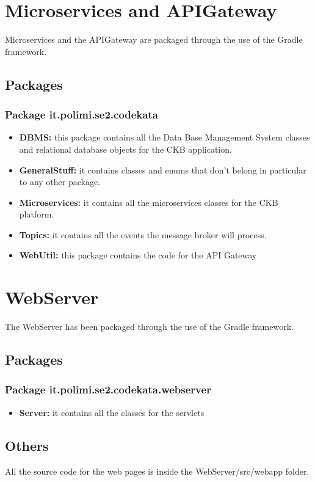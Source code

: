 \section{Microservices and APIGateway}
Microservices and the APIGateway are packaged through the use of the Gradle framework. 
\subsection{Packages}
\subsubsection{Package it.polimi.se2.codekata}
\begin{itemize}
    \item \textbf{DBMS:} this package contains all the Data Base Management System classes and relational database objects for the \ac{CKB} application.
    \item \textbf{GeneralStuff:} it contains classes and enums that don't belong in particular to any other package.
    \item \textbf{Microservices:} it contains all the microservices classes for the \ac{CKB} platform.
    \item \textbf{Topics:} it contains all the events the message broker will process.
    \item \textbf{WebUtil:} this package contains the code for the API Gateway
\end{itemize}
\newpage
\section{WebServer}
The WebServer has been packaged through the use of the Gradle framework.
\subsection{Packages}
\subsubsection{Package it.polimi.se2.codekata.webserver}
\begin{itemize}
    \item \textbf{Server: }it contains all the classes for the servlets
\end{itemize}
\subsection{Others}
All the source code for the web pages is inside the WebServer/src/webapp folder. 